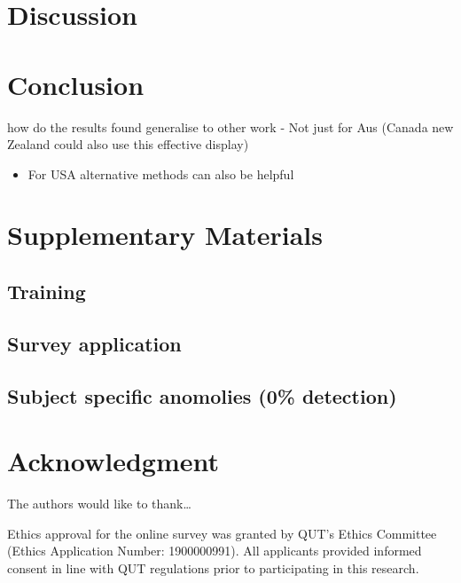 \documentclass[conference,final,]{IEEEtran}
\providecommand{\tightlist}{%
  \setlength{\itemsep}{0pt}\setlength{\parskip}{0pt}}
\begin{document}
\hypertarget{discussion}{%
\section{Discussion}\label{discussion}}

\hypertarget{conclusion}{%
\section{Conclusion}\label{conclusion}}

how do the results found generalise to other work - Not just for Aus
(Canada new Zealand could also use this effective display)

\begin{itemize}
\tightlist
\item
  For USA alternative methods can also be helpful
\end{itemize}

\hypertarget{supplementary-materials}{%
\section{Supplementary Materials}\label{supplementary-materials}}

\hypertarget{training}{%
\subsection{Training}\label{training}}

\hypertarget{survey-application}{%
\subsection{Survey application}\label{survey-application}}

\hypertarget{subject-specific-anomolies-0-detection}{%
\subsection{Subject specific anomolies (0\%
detection)}\label{subject-specific-anomolies-0-detection}}

\hypertarget{acknowledgment}{%
\section{Acknowledgment}\label{acknowledgment}}

The authors would like to thank\ldots{}

Ethics approval for the online survey was granted by QUT's Ethics
Committee (Ethics Application Number: 1900000991). All applicants
provided informed consent in line with QUT regulations prior to
participating in this research.
\end{document}
